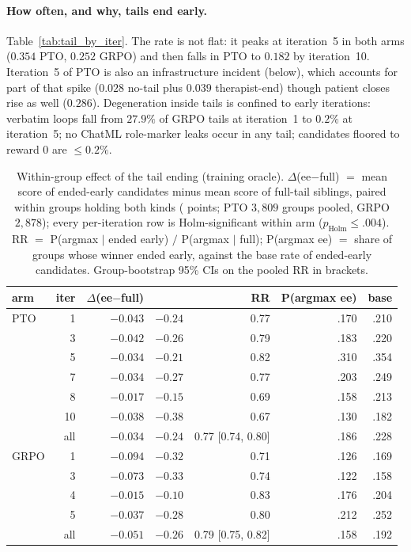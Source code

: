 \paragraph{How often, and why, tails end early.} Table~\ref{tab:tail_by_iter}. The rate is
not flat: it peaks at iteration~5 in both arms ($0.354$ PTO, $0.252$ GRPO) and then falls in
PTO to $0.182$ by iteration~10. Iteration~5 of PTO \Kf{} is also an infrastructure incident
(below), which accounts for part of that spike ($0.028$ no-tail plus $0.039$
therapist-end) though patient closes rise as well ($0.286$). Degeneration inside tails is
confined to early iterations: verbatim loops fall from $27.9\%$ of GRPO tails at iteration~1
to $0.2\%$ at iteration~5; no ChatML role-marker leaks occur in any tail; candidates
floored to reward $0$ are $\leq 0.2\%$.

\begin{table}[t]
  \centering\scriptsize
  \setlength{\tabcolsep}{2pt}
  \begin{tabular}{@{}lrrrrrr@{}}
    \toprule
    arm & iter & $\Delta$(ee$-$full) & \dz{} & RR & P(argmax ee) & base \\
    \midrule
    PTO \Kf{}  & 1  & $-0.043$ & $-0.24$ & 0.77 & .170 & .210 \\
               & 3  & $-0.042$ & $-0.26$ & 0.79 & .183 & .220 \\
               & 5  & $-0.034$ & $-0.21$ & 0.82 & .310 & .354 \\
               & 7  & $-0.034$ & $-0.27$ & 0.77 & .203 & .249 \\
               & 8  & $-0.017$ & $-0.15$ & 0.69 & .158 & .213 \\
               & 10 & $-0.038$ & $-0.38$ & 0.67 & .130 & .182 \\
               & all & $-0.034$ & $-0.24$ & 0.77 [0.74, 0.80] & .186 & .228 \\
    \midrule
    GRPO \Kf{} & 1  & $-0.094$ & $-0.32$ & 0.71 & .126 & .169 \\
               & 3  & $-0.073$ & $-0.33$ & 0.74 & .122 & .158 \\
               & 4  & $-0.015$ & $-0.10$ & 0.83 & .176 & .204 \\
               & 5  & $-0.037$ & $-0.28$ & 0.80 & .212 & .252 \\
               & all & $-0.051$ & $-0.26$ & 0.79 [0.75, 0.82] & .158 & .192 \\
    \bottomrule
  \end{tabular}
  \caption{Within-group effect of the tail ending (training oracle). $\Delta$(ee$-$full)
    $=$ mean score of ended-early candidates minus mean score of full-tail siblings, paired
    within groups holding both kinds (\QQ{} points; PTO $3{,}809$ groups pooled, GRPO
    $2{,}878$); every per-iteration row is Holm-significant within arm ($p_{\text{Holm}}
    \leq .004$). RR $=$ P(argmax $\mid$ ended early) $/$ P(argmax $\mid$ full); P(argmax
    ee) $=$ share of groups whose winner ended early, against the base rate of ended-early
    candidates. Group-bootstrap 95\% CIs on the pooled RR in brackets.}
  \label{tab:tail_within}
\end{table}

